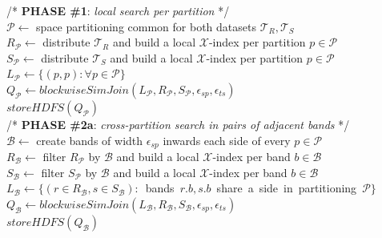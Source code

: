 \begin{algorithm}[!ht]
  \DontPrintSemicolon
  \begin{footnotesize}

  \nonl /*  {\bf PHASE \#1}: {\em local search per partition} */ \\
  
  $\mathcal{P} \leftarrow$ space partitioning common for both datasets $\mathcal{T}_{R}, \mathcal{T}_{S}$ \\
  $R_{\mathcal{P}} \leftarrow $ distribute $\mathcal{T}_{R}$ and build a local $\mathcal{X}$-index per partition $p \in \mathcal{P}$\\
  $S_{\mathcal{P}} \leftarrow $ distribute $\mathcal{T}_{S}$ and build a local $\mathcal{X}$-index per partition $p \in \mathcal{P}$\\
  \mbox{$L_{\mathcal{P}} \leftarrow \{ ( p , p ): \forall p \in \mathcal{P} \}$}  \\
  $Q_{\mathcal{P}} \leftarrow blockwiseSimJoin(L_{\mathcal{P}}, R_{\mathcal{P}}, S_{\mathcal{P}},\epsilon_{sp}, \epsilon_{ts})$ \\  
  $storeHDFS(Q_{\mathcal{P}})$   \\

  \nonl /*  {\bf PHASE \#2a}: {\em cross-partition search in pairs of adjacent bands} */ \\
  
  $\mathcal{B} \leftarrow$ create bands of width $\epsilon_{sp}$ inwards each side of every $p \in \mathcal{P}$ \\
  $R_{\mathcal{B}} \leftarrow $ filter $R_{\mathcal{P}}$ by $\mathcal{B}$ and build a local $\mathcal{X}$-index per band $b \in \mathcal{B}$\\
  $S_{\mathcal{B}} \leftarrow $ filter $S_{\mathcal{P}}$ by $\mathcal{B}$ and build a local $\mathcal{X}$-index per band $b \in \mathcal{B}$\\
  \mbox{$L_{\mathcal{B}} \leftarrow \{ ( r \in R_{\mathcal{B}}, s \in S_{\mathcal{B}}):$ bands $r.b, s.b$ share a side in partitioning $\mathcal{P}\}$} \\
  
  $Q_{\mathcal{B}} \leftarrow blockwiseSimJoin(L_{\mathcal{B}}, R_{\mathcal{B}}, S_{\mathcal{B}},\epsilon_{sp}, \epsilon_{ts})$ \\  
  $storeHDFS(Q_{\mathcal{B}})$  \\
  

\end{footnotesize}
\end{algorithm}

